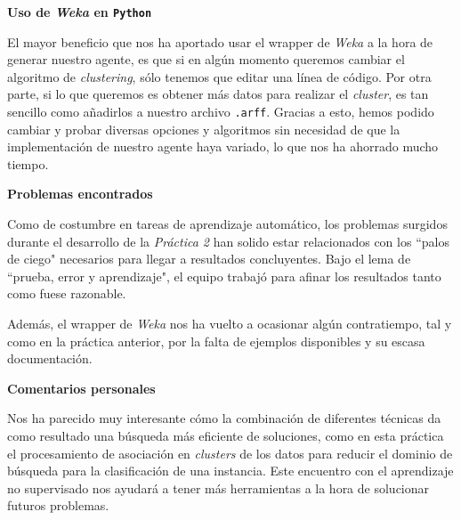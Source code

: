 \documentclass[12pt]{article}
\begin{document}
\vspace{0.5cm}
\centerline{\textbf{Uso de \textit{Weka} en \texttt{Python}}}
\vspace{0.5cm}

El mayor beneficio que nos ha aportado usar el wrapper de \textit{Weka} a la hora de generar nuestro agente, es que si en algún momento queremos cambiar el algoritmo de \textit{clustering}, sólo tenemos que editar una línea de código. Por otra parte, si lo que queremos es obtener más datos para realizar el \textit{cluster}, es tan sencillo como añadirlos a nuestro archivo \texttt{.arff}. Gracias a esto, hemos podido cambiar y probar diversas opciones y algoritmos sin necesidad de que la implementación de nuestro agente haya variado, lo que nos ha ahorrado mucho tiempo.

\vspace{0.5cm}
\centerline{\textbf{Problemas encontrados}}
\vspace{0.5cm}

Como de costumbre en tareas de aprendizaje automático, los problemas surgidos durante el desarrollo de la \textit{Práctica 2} han solido estar relacionados con los ``palos de ciego" necesarios para llegar a resultados concluyentes. Bajo el lema de ``prueba, error y aprendizaje", el equipo trabajó para afinar los resultados tanto como fuese razonable.

Además, el wrapper de \textit{Weka} nos ha vuelto a ocasionar algún contratiempo, tal y como en la práctica anterior, por la falta de ejemplos disponibles y su escasa documentación.

\vspace{0.5cm}
\centerline{\textbf{Comentarios personales}}
\vspace{0.5cm}

Nos ha parecido muy interesante cómo la combinación de diferentes técnicas da como resultado una búsqueda más eficiente de soluciones, como en esta práctica el procesamiento de asociación en \textit{clusters} de los datos para reducir el dominio de búsqueda para la clasificación de una instancia. Este encuentro con el aprendizaje no supervisado nos ayudará a tener más herramientas a la hora de solucionar futuros problemas.
\end{document}
